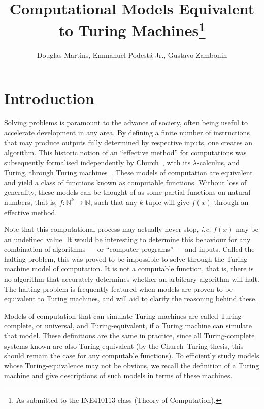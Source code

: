 \documentclass[12pt]{article}
\title{Computational Models Equivalent to Turing Machines\footnote{
    As submitted to the INE410113 class (Theory of Computation).}}
\author{Douglas Martins\inst{1}, Emmanuel Podestá Jr.\inst{1}, Gustavo Zambonin\inst{1}}
\begin{document}
 

\maketitle

\section{Introduction}\label{sec:intro}
 
Solving problems is paramount to the advance of society, often being useful to accelerate development in any area. By defining a finite number of instructions that may produce outputs fully determined by respective inputs, one creates an algorithm. This historic notion of an ``effective method'' for computations was subsequently formalised independently by Church~\cite{Church:article:1936:apr}, with its $\lambda$-calculus, and Turing, through Turing machines~\cite{Turing:article:1937:jan}. These models of computation are equivalent and yield a class of functions known as computable functions. Without loss of generality, these models can be thought of as some partial functions on natural numbers, that is, $f : \mathbb{N}^{k} \rightarrow \mathbb{N}$, such that any $k$-tuple will give $f(x)$ through an effective method. 

Note that this computational process may actually never stop, \emph{i.e.} $f(x)$ may be an undefined value. It would be interesting to determine this behaviour for any combination of algorithms --- or ``computer programs'' --- and inputs. Called the halting problem, this was proved to be impossible to solve through the Turing machine model of computation. It is not a computable function, that is, there is no algorithm that accurately determines whether an arbitrary algorithm will halt. The halting problem is frequently featured when models are proven to be equivalent to Turing machines, and will aid to clarify the reasoning behind these.

Models of computation that can simulate Turing machines are called Turing-complete, or universal, and Turing-equivalent, if a Turing machine can simulate that model. These definitions are the same in practice, since all Turing-complete systems known are also Turing-equivalent (by the Church--Turing thesis, this should remain the case for any computable functions). To efficiently study models whose Turing-equivalence may not be obvious, we recall the definition of a Turing machine and give descriptions of such models in terms of these machines.
\end{document}

